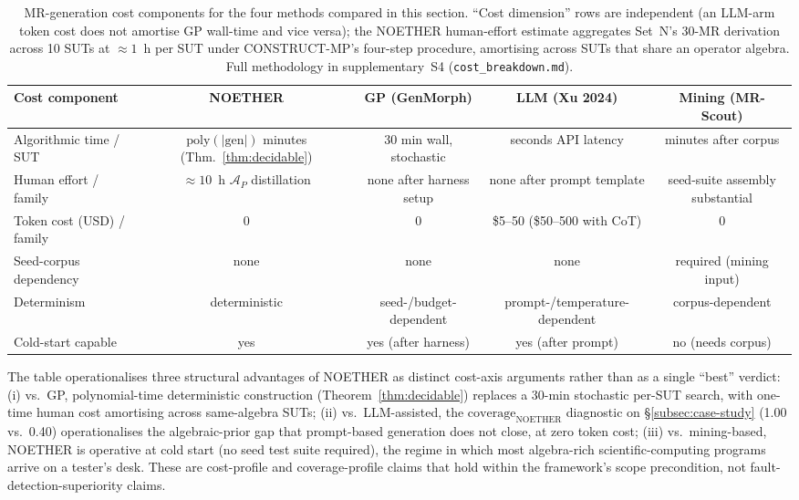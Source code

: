 \documentclass[acmsmall, screen]{acmart}
\begin{document}
\begin{table}[h]
\centering
\caption{MR-generation cost components for the four methods compared in this section. ``Cost dimension'' rows are independent (an LLM-arm token cost does not amortise GP wall-time and vice versa); the NOETHER human-effort estimate aggregates Set~N's 30-MR derivation across 10 SUTs at $\approx 1$~h per SUT under CONSTRUCT-MP's four-step procedure, amortising across SUTs that share an operator algebra. Full methodology in supplementary~S4 (\texttt{cost\_breakdown.md}).}
\label{tab:gen-cost}
\small
\begin{tabular}{lcccc}
\toprule
Cost component & NOETHER & GP (GenMorph) & LLM (Xu 2024) & Mining (MR-Scout) \\
\midrule
Algorithmic time / SUT       & $\mathrm{poly}(|\mathrm{gen}|)$ minutes (Thm.~\ref{thm:decidable}) & 30 min wall, stochastic & seconds API latency & minutes after corpus \\
Human effort / family        & $\approx 10$~h $\mathcal{A}_P$ distillation             & none after harness setup    & none after prompt template & seed-suite assembly substantial \\
Token cost (USD) / family    & 0                                                       & 0                           & \$5--50 (\$50--500 with CoT) & 0 \\
Seed-corpus dependency       & none                                                    & none                        & none                       & required (mining input) \\
Determinism                  & deterministic                                           & seed-/budget-dependent      & prompt-/temperature-dependent & corpus-dependent \\
Cold-start capable           & yes                                                    & yes (after harness)         & yes (after prompt)         & no (needs corpus) \\
\bottomrule
\end{tabular}
\end{table}

The table operationalises three structural advantages of NOETHER as distinct cost-axis arguments rather than as a single ``best'' verdict: (i) vs.\ GP, polynomial-time deterministic construction (Theorem~\ref{thm:decidable}) replaces a 30-min stochastic per-SUT search, with one-time human cost amortising across same-algebra SUTs; (ii) vs.\ LLM-assisted, the $\mathrm{coverage}_{\mathrm{NOETHER}}$ diagnostic on \S\ref{subsec:case-study} (1.00 vs.\ 0.40) operationalises the algebraic-prior gap that prompt-based generation does not close, at zero token cost; (iii) vs.\ mining-based, NOETHER is operative at cold start (no seed test suite required), the regime in which most algebra-rich scientific-computing programs arrive on a tester's desk. These are cost-profile and coverage-profile claims that hold within the framework's scope precondition, not fault-detection-superiority claims.
\end{document}
